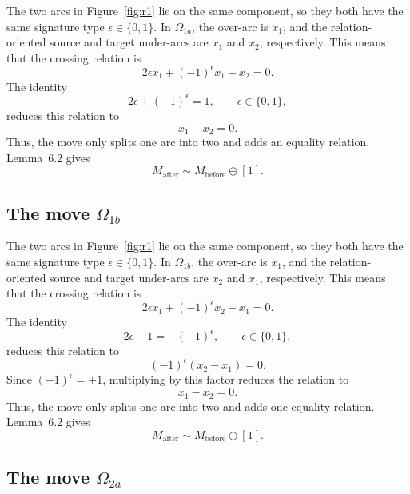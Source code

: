 \documentclass[11pt]{article}
\theoremstyle{definition}
\begin{document}
The two arcs in Figure~\ref{fig:r1} lie on the same component, so they both have the same signature type $\epsilon\in\{0,1\}$. In $\Omega_{1a}$, the over-arc is $x_1$, and the relation-oriented source and target under-arcs are $x_1$ and $x_2$, respectively. This means that the crossing relation is
\[
2\epsilon x_1+(-1)^\epsilon x_1-x_2=0.
\]
The identity
\[
2\epsilon+(-1)^\epsilon=1,
\qquad
\epsilon\in\{0,1\},
\]
reduces this relation to
\[
x_1-x_2=0.
\]
Thus, the move only splits one arc into two and adds an equality relation. Lemma~6.2 gives
\[
M_{\mathrm{after}}\sim M_{\mathrm{before}}\oplus[1].
\]

\subsection{The move \texorpdfstring{$\Omega_{1b}$}{Omega 1b}}

The two arcs in Figure~\ref{fig:r1} lie on the same component, so they both have the same signature type $\epsilon\in\{0,1\}$. In $\Omega_{1b}$, the over-arc is $x_1$, and the relation-oriented source and target under-arcs are $x_2$ and $x_1$, respectively. This means that the crossing relation is
\[
2\epsilon x_1+(-1)^\epsilon x_2-x_1=0.
\]
The identity
\[
2\epsilon-1=-(-1)^\epsilon,
\qquad
\epsilon\in\{0,1\},
\]
reduces this relation to
\[
(-1)^\epsilon(x_2-x_1)=0.
\]
Since $(-1)^\epsilon=\pm1$, multiplying by this factor reduces the relation to
\[
x_1-x_2=0.
\]
Thus, the move only splits one arc into two and adds one equality relation. Lemma~6.2 gives
\[
M_{\mathrm{after}}\sim M_{\mathrm{before}}\oplus[1].
\]

\subsection{The move \texorpdfstring{$\Omega_{2a}$}{Omega 2a}}
\end{document}
